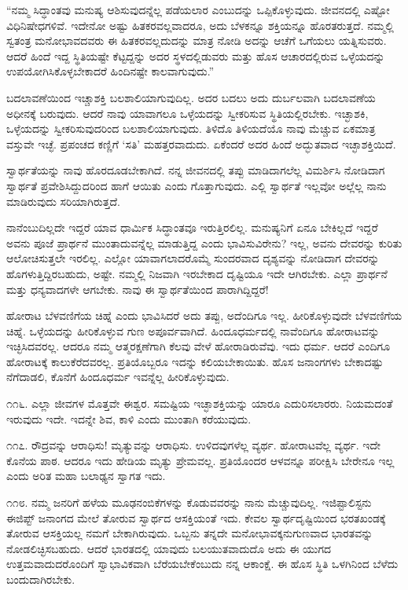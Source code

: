 “ನಮ್ಮ ಸಿದ್ಧಾಂತವು ಮನುಷ್ಯ ಆಶಿಸುವುದನ್ನೆಲ್ಲ ಪಡೆಯಲಾರ ಎಂಬುದನ್ನು ಒಪ್ಪಿಕೊಳ್ಳುವುದು. ಜೀವನದಲ್ಲಿ ಎಷ್ಟೋ ವಿಧಿನಿಷೇಧಗಳಿವೆ. ಇದೇನೋ ಅಷ್ಟು ಹಿತಕರವಲ್ಲವಾದರೂ, ಅದು ಬೆಳಕನ್ನೂ ಶಕ್ತಿಯನ್ನೂ ಹೊರತರುತ್ತದೆ. ನಮ್ಮಲ್ಲಿ ಸ್ವತಂತ್ರ ಮನೋಭಾವದವರು ಈ ಹಿತಕರವಲ್ಲದುದನ್ನು ಮಾತ್ರ ನೋಡಿ ಅದನ್ನು ಆಚೆಗೆ ಒಗೆಯಲು ಯತ್ನಿಸುವರು. ಆದರೆ ಹಿಂದೆ ಇದ್ದ ಸ್ಥಿತಿಯಷ್ಟೇ ಕೆಟ್ಟದ್ದನ್ನು ಅದರ ಸ್ಥಳದಲ್ಲಿಡುವರು ಮತ್ತು ಹೊಸ ಆಚಾರದಲ್ಲಿರುವ ಒಳ್ಳೆಯದನ್ನು ಉಪಯೋಗಿಸಿಕೊಳ್ಳಬೇಕಾದರೆ ಹಿಂದಿನಷ್ಟೇ ಕಾಲವಾಗುವುದು.”

ಬದಲಾವಣೆಯಿಂದ ಇಚ್ಚಾಶಕ್ತಿ ಬಲಶಾಲಿಯಾಗುವುದಿಲ್ಲ. ಅದರ ಬದಲು ಅದು ದುರ್ಬಲವಾಗಿ ಬದಲಾವಣೆಯ ಅಧೀನಕ್ಕೆ ಬರುವುದು. ಆದರೆ ನಾವು ಯಾವಾಗಲೂ ಒಳ್ಳೆಯದನ್ನು ಸ್ವೀಕರಿಸುವ ಸ್ಥಿತಿಯಲ್ಲಿರಬೇಕು. ಇಚ್ಛಾಶಕಿ, ಒಳ್ಳೆಯದನ್ನು ಸ್ವೀಕರಿಸುವುದರಿಂದ ಬಲಶಾಲಿಯಾಗುವುದು. ತಿಳಿದೊ ತಿಳಿಯದೆಯೊ ನಾವು ಮೆಚ್ಚುವ ಏಕಮಾತ್ರ ವಸ್ತುವೇ ಇಚ್ಛೆ. ಪ್ರಪಂಚದ ಕಣ್ಣಿಗೆ ‘ಸತಿ’ ಮಹತ್ತರವಾದುದು. ಏಕೆಂದರೆ ಅದರ ಹಿಂದೆ ಅದ್ಭುತವಾದ ಇಚ್ಛಾಶಕ್ತಿಯಿದೆ.

ಸ್ವಾರ್ಥತೆಯನ್ನು ನಾವು ಹೊರದೂಡಬೇಕಾಗಿದೆ. ನನ್ನ ಜೀವನದಲ್ಲಿ ತಪ್ಪು ಮಾಡಿದಾಗಲೆಲ್ಲ ವಿಮರ್ಶಿಸಿ ನೋಡಿದಾಗ ಸ್ವಾರ್ಥತೆ ಪ್ರವೇಶಿಸಿದ್ದುದರಿಂದ ಹಾಗೆ ಆಯಿತು ಎಂದು ಗೊತ್ತಾಗುವುದು. ಎಲ್ಲಿ ಸ್ವಾರ್ಥತೆ ಇಲ್ಲವೋ ಅಲ್ಲೆಲ್ಲ ನಾನು ಮಾಡಿರುವುದು ಸರಿಯಾಗಿರುತ್ತದೆ.

ನಾನೆಂಬುದಿಲ್ಲದೇ ಇದ್ದರೆ ಯಾವ ಧಾರ್ಮಿಕ ಸಿದ್ಧಾಂತವೂ ಇರುತ್ತಿರಲಿಲ್ಲ. ಮನುಷ್ಯನಿಗೆ ಏನೂ ಬೇಕಿಲ್ಲದೆ ಇದ್ದರೆ ಅವನು ಪೂಜೆ ಪ್ರಾರ್ಥನೆ ಮುಂತಾದುವನ್ನೆಲ್ಲ ಮಾಡುತ್ತಿದ್ದ ಎಂದು ಭಾವಿಸುವಿರೇನು? ಇಲ್ಲ, ಅವನು ದೇವರನ್ನು ಕುರಿತು ಆಲೋಚಿಸುತ್ತಲೇ ಇರಲಿಲ್ಲ. ಎಲ್ಲೋ ಯಾವಾಗಲಾದರೊಮ್ಮೆ ಸುಂದರವಾದ ದೃಶ್ಯವನ್ನು ನೋಡಿದಾಗ ದೇವರನ್ನು ಹೊಗಳುತ್ತಿದ್ದಿರಬಹುದು, ಅಷ್ಟೇ. ನಮ್ಮಲ್ಲಿ ನಿಜವಾಗಿ ಇರಬೇಕಾದ ದೃಷ್ಟಿಯೂ ಇದೇ ಆಗಿರಬೇಕು. ಎಲ್ಲಾ ಪ್ರಾರ್ಥನೆ ಮತ್ತು ಧನ್ಯವಾದಗಳೇ ಆಗಬೇಕು. ನಾವು ಈ ಸ್ವಾರ್ಥತೆಯಿಂದ ಪಾರಾಗಿದ್ದಿದ್ದರೆ!

ಹೋರಾಟ ಬೆಳವಣಿಗೆಯ ಚಿಹ್ನೆ ಎಂದು ಭಾವಿಸಿದರೆ ಅದು ತಪ್ಪು, ಅದೆಂದಿಗೂ ಇಲ್ಲ. ಹೀರಿಕೊಳ್ಳುವುದೇ ಬೆಳವಣಿಗೆಯ ಚಿಹ್ನೆ. ಒಳ್ಳೆಯದನ್ನು ಹೀರಿಕೊಳ್ಳುವ ಗುಣ ಅಪೂರ್ವವಾಗಿದೆ. ಹಿಂದೂಧರ್ಮದಲ್ಲಿ ನಾವೆಂದಿಗೂ ಹೋರಾಟವನ್ನು ಇಚ್ಛಿಸಿದವರಲ್ಲ. ಆದರೂ ನಮ್ಮ ಆತ್ಮರಕ್ಷಣೆಗಾಗಿ ಕೆಲವು ವೇಳೆ ಹೋರಾಡಿರುವೆವು. ಇದು ಧರ್ಮ. ಆದರೆ ಎಂದಿಗೂ ಹೋರಾಟಕ್ಕೆ ಕಾಲುಕೆರೆದವರಲ್ಲ. ಪ್ರತಿಯೊಬ್ಬರೂ ಇದನ್ನು ಕಲಿಯಬೇಕಾಯಿತು. ಹೊಸ ಜನಾಂಗಗಳು ಬೇಕಾದಷ್ಟು ನೆಗೆದಾಡಲಿ, ಕೊನೆಗೆ ಹಿಂದೂಧರ್ಮ ಇವನ್ನೆಲ್ಲ ಹೀರಿಕೊಳ್ಳುವುದು.

೧೧೬. ಎಲ್ಲಾ ಜೀವಗಳ ಮೊತ್ತವೇ ಈಶ್ವರ. ಸಮಷ್ಟಿಯ ಇಚ್ಛಾಶಕ್ತಿಯನ್ನು ಯಾರೂ ಎದುರಿಸಲಾರರು. ನಿಯಮದಂತೆ ಇರುವುದು ಇದೇ. ಇದನ್ನೇ ಶಿವ, ಕಾಳಿ ಎಂದು ಮುಂತಾಗಿ ಕರೆಯುವುದು.

೧೧೭. ರೌದ್ರವನ್ನು ಆರಾಧಿಸು! ಮೃತ್ಯುವನ್ನು ಆರಾಧಿಸು. ಉಳಿದವುಗಳೆಲ್ಲ ವ್ಯರ್ಥ. ಹೋರಾಟವೆಲ್ಲ ವ್ಯರ್ಥ. ಇದೇ ಕೊನೆಯ ಪಾಠ. ಆದರೂ ಇದು ಹೇಡಿಯ ಮೃತ್ಯು ಪ್ರೇಮವಲ್ಲ. ಪ್ರತಿಯೊಂದರ ಆಳವನ್ನೂ ಪರೀಕ್ಷಿಸಿ ಬೇರೇನೂ ಇಲ್ಲ ಎಂದು ಅರಿತ ಮಹಾ ಬಲಾಢ್ಯನ ಸ್ವಾಗತ ಇದು.

೧೧೮. ನಮ್ಮ ಜನರಿಗೆ ಹಳೆಯ ಮೂಢನಂಬಿಕೆಗಳನ್ನು ಕೊಡುವವರನ್ನು ನಾನು ಮೆಚ್ಚುವುದಿಲ್ಲ. ಇಜಿಪ್ಟಾಲಿಸ್ಟನು ಈಜಿಪ್ಟ್ ಜನಾಂಗದ ಮೇಲೆ ತೋರುವ ಸ್ವಾರ್ಥದ ಆಸಕ್ತಿಯಂತೆ ಇದು. ಕೇವಲ ಸ್ವಾರ್ಥದೃಷ್ಟಿಯಿಂದ ಭರತಖಂಡಕ್ಕೆ ತೋರುವ ಆಸಕ್ತಿಯಲ್ಲ ನಮಗೆ ಬೇಕಾಗಿರುವುದು. ಒಬ್ಬನು ತನ್ನದೇ ಮನೋಭಾವಕ್ಕನುಗುಣವಾದ ಭಾರತವನ್ನು ನೋಡಲಿಚ್ಛಿಸಬಹುದು. ಆದರೆ ಭಾರತದಲ್ಲಿ ಯಾವುದು ಬಲಯುತವಾದುದೊ ಅದು ಈ ಯುಗದ ಉತ್ತಮವಾದುದರೊಂದಿಗೆ ಸ್ವಾಭಾವಿಕವಾಗಿ ಬೆರೆಯಬೇಕೆಂಬುದು ನನ್ನ ಆಕಾಂಕ್ಷೆ. ಈ ಹೊಸ ಸ್ಥಿತಿ ಒಳಗಿನಿಂದ ಬೆಳೆದು ಬಂದುದಾಗಿರಬೇಕು.

